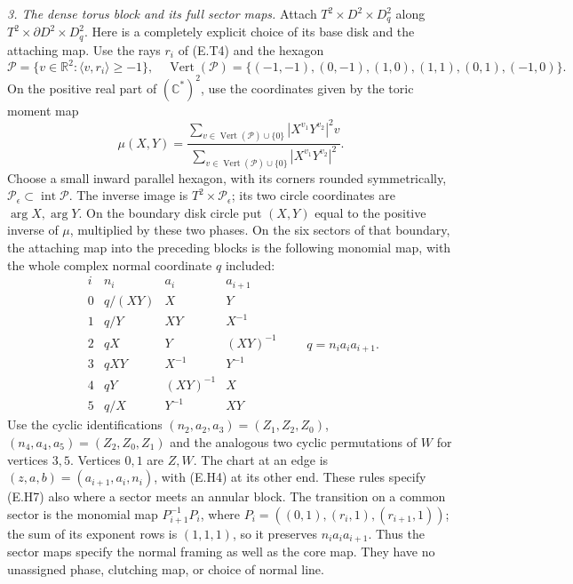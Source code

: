 \emph{3. The dense torus block and its full sector maps.}
Attach $T^2\times D^2\times D^2_q$ along
$T^2\times\partial D^2\times D^2_q$.  Here is a completely explicit
choice of its base disk and the attaching map.  Use the rays
$r_i$ of (E.T4) and the hexagon
\[
 \mathcal P=\{v\in\mathbb R^2:\langle v,r_i\rangle\geq-1\},
 \quad
 \operatorname{Vert}(\mathcal P)=
 \{(-1,-1),(0,-1),(1,0),(1,1),(0,1),(-1,0)\}.
 \tag{E.H5}
\]
On the positive real part of $(\mathbb C^*)^2$, use the coordinates
given by the toric moment map
\[
 \mu(X,Y)=
 \frac{\displaystyle\sum_{v\in\operatorname{Vert}(\mathcal P)\cup\{0\}}
                 |X^{v_1}Y^{v_2}|^2v}
      {\displaystyle\sum_{v\in\operatorname{Vert}(\mathcal P)\cup\{0\}}
                 |X^{v_1}Y^{v_2}|^2}.
 \tag{E.H6}
\]
Choose a small inward parallel hexagon, with its corners rounded
symmetrically, $\mathcal P_\epsilon\subset\operatorname{int}\mathcal P$.
The inverse image is $T^2\times\mathcal P_\epsilon$; its two circle
coordinates are $\arg X,\arg Y$.  On the boundary disk circle put
$(X,Y)$ equal to the positive inverse of $\mu$, multiplied by these
two phases.  On the six sectors of that boundary, the attaching
map into the preceding blocks is the following monomial map, with
the whole complex normal coordinate $q$ included:
\[
\begin{array}{c|ccc}
 i& n_i&a_i&a_{i+1}\\ \hline
0&q/(XY)&X&Y\\
1&q/Y&XY&X^{-1}\\
2&qX&Y&(XY)^{-1}\\
3&qXY&X^{-1}&Y^{-1}\\
4&qY&(XY)^{-1}&X\\
5&q/X&Y^{-1}&XY
\end{array}
\qquad q=n_i a_i a_{i+1}.
\tag{E.H7}
\]
Use the cyclic identifications
$(n_2,a_2,a_3)=(Z_1,Z_2,Z_0)$,
$(n_4,a_4,a_5)=(Z_2,Z_0,Z_1)$ and the analogous two cyclic
permutations of $W$ for vertices $3,5$.  Vertices $0,1$ are $Z,W$.
The chart at an edge is $(z,a,b)=(a_{i+1},a_i,n_i)$, with (E.H4)
at its other end.  These rules specify (E.H7) also where a sector
meets an annular block.  The transition on a common sector is the
monomial map $P_{i+1}^{-1}P_i$, where
$P_i=((0,1),(r_i,1),(r_{i+1},1))$; the sum of its exponent rows
is $(1,1,1)$, so it preserves $n_i a_i a_{i+1}$.  Thus the sector maps specify the
normal framing as well as the core map.  They have no unassigned
phase, clutching map, or choice of normal line.

